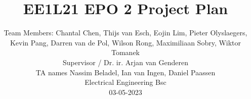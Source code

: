 \documentclass[whitelogo,oneside]{TUD-report2020}
\begin{document}
\frontmatter


\title[tudelft-white]{\Huge{EE1L21 EPO 2 Project Plan}}
\subtitle[tudelft-black]{}

\author[tudelft-white]{\Large{Team Members: Chantal Chen, Thijs van Esch, Eojin Lim, Pieter Olyslaegers, Kevin Pang, Darren van de Pol, Wilson Rong, Maximiliaan Sobry, Wiktor Tomanek\\
Supervisor / Dr. ir. Arjan van Genderen \\
TA names Nassim Beladel, Ian van Ingen, Daniel Paassen \\
Electrical Engineering Bsc\\
03-05-2023\\}}
  
 
\makecover%


% 

% 

\tableofcontents

\mainmatter











\appendix

%

\printbibliography
\end{document}
